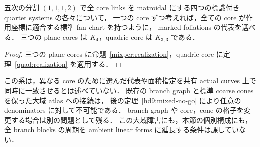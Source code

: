 \begin{corollary}\label{mixper:individual}
五次の分割 $(1,1,1,2)$ で全 core links を matroidal にする四つの標識付き quartet systems の各々について，
一つの core ずつ考えれば，全ての core が作用座標に適合する標準 fan chart を持つように，
marked foliations の代表を選べる．
三つの plane cores は $K_4$，quadric core は $K_{3,3}$ である．
\end{corollary}

\begin{proof}
三つの plane cores に命題~\ref{mixper:realization}，quadric core に定理~\ref{quad:realization} を適用する．
\end{proof}

この系は，異なる core のために選んだ代表や面積指定を共有 actual curves 上で同時に一致させるとは述べていない．
既存の branch graph と標準 coarse cones を保った大域 atlas への接続は，
後の定理~\ref{hd9:mixed-no-go} により任意の denominators に対して不可能である．
branch graph や core，cone の格子を変更する場合は別の問題として残る．
この大域障害にも，本節の個別構成にも，全 branch blocks の周期を
ambient linear forms に延長する条件は課していない．
